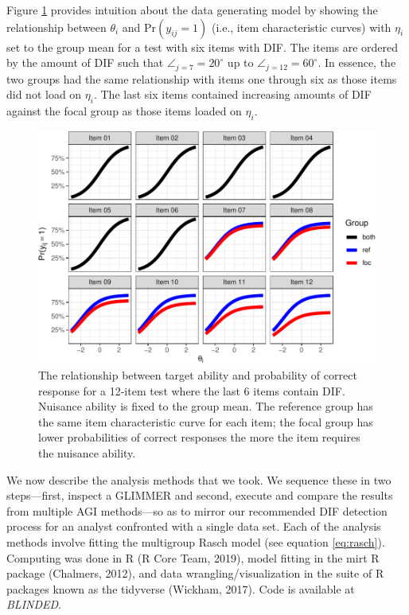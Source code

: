 \documentclass[
  english,
  man,floatsintext]{apa6}
\begin{document}
Figure \ref{fig:difmap} provides intuition about the data generating model by showing the relationship between \(\theta_i\) and \(\text{Pr}(y_{ij} = 1)\) (i.e., item characteristic curves) with \(\eta_i\) set to the group mean for a test with six items with DIF. The items are ordered by the amount of DIF such that \(\angle_{j = 7} = 20^\circ\) up to \(\angle_{j = 12} = 60^\circ\). In essence, the two groups had the same relationship with items one through six as those items did not load on \(\eta_i\). The last six items contained increasing amounts of DIF against the focal group as those items loaded on \(\eta_i\).

\begin{figure}[h]

{\centering \includegraphics[width=1\linewidth]{paper_apa_files/figure-latex/difmap-1}

}

\caption{The relationship between target ability and probability of correct response for a 12-item test where the last 6 items contain DIF. Nuisance ability is fixed to the group mean. The reference group has the same item characteristic curve for each item; the focal group has lower probabilities of correct responses the more the item requires the nuisance ability.}\label{fig:difmap}
\end{figure}

We now describe the analysis methods that we took. We sequence these in two steps---first, inspect a GLIMMER and second, execute and compare the results from multiple AGI methods---so as to mirror our recommended DIF detection process for an analyst confronted with a single data set. Each of the analysis methods involve fitting the multigroup Rasch model (see equation \ref{eq:rasch}). Computing was done in R (R Core Team, 2019), model fitting in the mirt R package (Chalmers, 2012), and data wrangling/visualization in the suite of R packages known as the tidyverse (Wickham, 2017). Code is available at \emph{BLINDED}.
\end{document}
